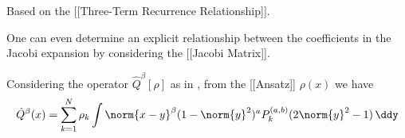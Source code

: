 Based on the {[}{[}Three-Term Recurrence
Relationship{]}{]}.

One can even determine an explicit relationship between the coefficients
in the Jacobi expansion by considering the {[}{[}Jacobi Matrix{]}{]}.

Considering the operator $\hat{Q}^\beta[\rho]$ as in , from the [[Ansatz]] $\rho(x)$ we have
$$\hat{Q}^{\beta}(x) = \sum_{k=1}^{N} \rho_{k} \int \norm{x-y}^{\beta}(1-\norm{y}^2)^{a}P_{k}^{(a, b)}(2\norm{y}^{2}- 1) \,\ddy$$
